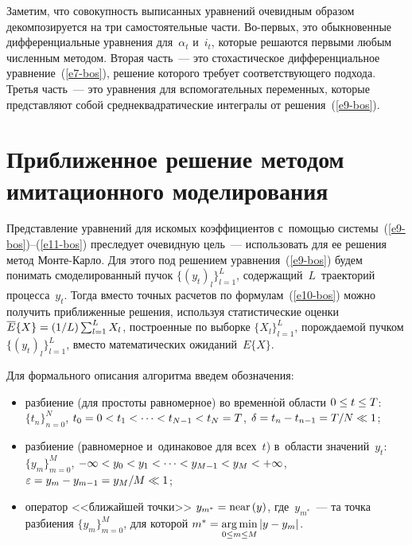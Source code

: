 \begin{multicols}{2}
     Заметим, что совокупность выписанных уравнений очевидным образом 
декомпозируется на три самостоятельные части. Во-пер\-вых, это 
обыкновенные дифференциальные уравнения для~$\alpha_t$ и~$i_t$, 
которые решаются первыми любым численным методом. Вторая часть~--- 
это стохастическое дифференциальное уравнение~(\ref{e7-bos}), решение 
которого требует соответствующего подхода. Третья часть~--- это уравнения 
для вспомогательных переменных, которые представляют собой 
среднеквадратические интегралы от решения~(\ref{e9-bos}).
     
\section{Приближенное решение методом имитационного 
моделирования}

     Представление уравнений для искомых коэффициентов с~помощью 
системы~(\ref{e9-bos})--(\ref{e11-bos}) преследует очевидную цель~--- 
использовать для ее решения метод Мон\-те-Кар\-ло. Для этого под 
решением уравнения~(\ref{e9-bos}) будем понимать смоделированный пучок 
$\{ (y_t)_l\}^L_{l=1}$, содержащий~$L$~траекторий процесса~$y_t$. Тогда 
вместо точных расчетов по формулам~(\ref{e10-bos}) можно получить 
приближенные решения, используя статистические оценки 
$\overline{E}\{X\}\hm= (1/L)\sum\nolimits^L_{l=1} X_l$, построенные по 
выборке $\{ X_l\}^L_{l=1}$, порождаемой пучком $\{(y_t)_l\}^L_{l=1}$, 
вместо математических ожиданий~$E\{X\}$.
     
     Для формального описания алгоритма введем обозначения:
     \begin{itemize}
\item разбиение (для простоты равномерное) во временн$\acute{\mbox{о}}$й области $0\hm\leq 
t\hm\leq T$: $\{t_n\}^N_{n=0}$, $t_0\hm=0\hm< t_1<\cdots < t_{N-1}\hm< t_N 
\hm= T$, $\delta\hm= t_n\hm-t_{n-1}\hm= T/N\hm\ll 1$;
\item разбиение (равномерное и~одинаковое для всех~$t$) в~об\-ласти 
значений~$y_t$:  $\{y_m\}^M_{m=0}$, $-\infty\hm< y_0\hm< y_1<\cdots <
y_{M-1} \hm< y_M\hm< +\infty$, $\varepsilon\hm= y_m\hm-y_{m-1}\hm= 
y_M/M\hm\ll 1$;
\item оператор <<ближайшей точки>> $y_{m^*}\hm=\mathrm{near}\,(y)$, 
где~$y_{m^*}$~--- та точка разбиения $\{y_m\}^M_{m=0}$, для которой 
$m^*\hm= \argmin\limits_{0\leq m\leq M} \vert y\hm- y_m\vert$.
\end{itemize}
     

\end{multicols}
